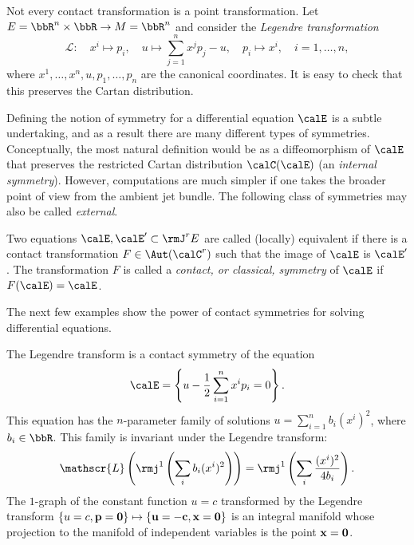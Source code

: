 \begin{example}
    Not every contact transformation is a point transformation. Let $E=\bbR^n\times \bbR\to M=\bbR^n$ and consider the \emph{Legendre transformation} 
    \[\mathscr{L}:\quad x^i\mapsto p_i,\quad u\mapsto \sum_{j=1}^n x^jp_j-u,\quad p_i\mapsto x^i,\quad i=1,\ldots,n,\]
    where $x^1,\ldots,x^n,u,p_1,\ldots,p_n$ are the canonical coordinates. It is easy to check that this preserves the Cartan distribution.
\end{example}

Defining the notion of symmetry for a differential equation $\calE$ is a subtle undertaking, and as a result there are many different types of symmetries. Conceptually, the most natural definition would be as a diffeomorphism of $\calE$ that preserves the restricted Cartan distribution $\calC(\calE)$ (an \emph{internal symmetry}). However, computations are much simpler if one takes the broader point of view from the ambient jet bundle. The following class of symmetries may also be called \emph{external}.

\begin{defn}
    Two equations $\calE,\calE'\subset\rmJ^r E$ are called (locally) equivalent if there is a contact transformation $F\in\Aut(\calC^r)$ such that the image of $\calE$ is $\calE'$. The transformation $F$ is called a \emph{contact, or classical, symmetry} of $\calE$ if $F(\calE)=\calE$.
\end{defn}

The next few examples show the power of contact symmetries for solving differential equations.

\begin{example}
    The Legendre transform is a contact symmetry of the equation 
    \[\calE=\left\{u-\frac12\sum_{i=1}^n x^ip_i=0\right\}.\]
    This equation has the $n$-parameter family of solutions $u=\sum_{i=1}^n b_i(x^i)^2$, where $b_i\in\bbR$. This family is invariant under the Legendre transform:
    \[\mathscr{L}\left(\rmj^1\left(\sum_i b_i(x^i)^2\right)\right)=\rmj^1\left(\sum_i \frac{(x^i)^2}{4b_i}\right).\]
    The $1$-graph of the constant function $u=c$ transformed by the Legendre transform $\{u=c,\bf{p}=0\}\mapsto \{u=-c,\bf{x}=0\}$ is an integral manifold whose projection to the manifold of independent variables is the point $\bf{x}=0$.
\end{example}

